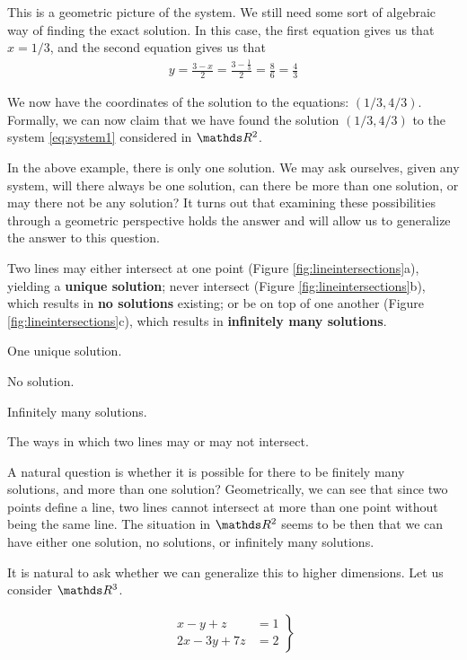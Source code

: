 \documentclass[11pt]{article}
\newcommand{\keyphrase}{\textbf}
\begin{document}
This is a geometric picture of the system. We still need some sort of algebraic way of finding the exact solution. In this case, the first equation gives us that $x = 1/3$, and the second equation gives us that
\begin{align*}
y
= \frac{3-x}{2}
= \frac{3 - \frac{1}{3}}{2}
= \frac{8}{6}
= \frac{4}{3}
\end{align*}

We now have the coordinates of the solution to the equations: $(1/3, 4/3)$. Formally, we can now claim that we have found the solution $(1/3, 4/3)$ to the system \eqref{eq:system1} considered in $\bbR^2$.

\vspace{1cm}

In the above example, there is only one solution. We may ask ourselves, given any system, will there always be one solution, can there be more than one solution, or may there not be any solution? It turns out that examining these possibilities through a geometric perspective holds the answer and will allow us to generalize the answer to this question.


Two lines may either intersect at one point (Figure \ref{fig:lineintersections}a), yielding a \keyphrase{unique solution}; never intersect (Figure \ref{fig:lineintersections}b), which results in \keyphrase{no solutions} existing; or be on top of one another (Figure \ref{fig:lineintersections}c), which results in \keyphrase{infinitely many solutions}.

One unique solution.

No solution.

Infinitely many solutions.

The ways in which two lines may or may not intersect.

A natural question is whether it is possible for there to be finitely many solutions, and more than one solution? Geometrically, we can see that since two points define a line, two lines cannot intersect at more than one point without being the same line. The situation in $\bbR^2$ seems to be then that we can have either one solution, no solutions, or infinitely many solutions.

It is natural to ask whether we can generalize this to higher dimensions. Let us consider $\bbR^3$.

\begin{align*}
\left.
\begin{aligned}
x - y + z &= 1
\\
2x - 3y + 7z &= 2
\end{aligned}
\right\}
\end{align*}
\end{document}
